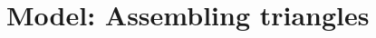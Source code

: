 \documentclass[phd,lfcs]{infthesis}
\begin{document}
\appendix
\chapter{Model: Assembling triangles}
\label{app:triangles}

\fi

% 

\singlespace

% 

\printbibliography

\end{document}
